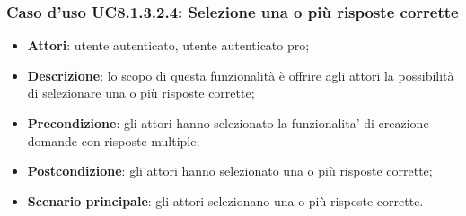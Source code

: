 \subsubsection{Caso d'uso UC8.1.3.2.4: Selezione una o più risposte corrette}
	\begin{itemize}
		\item
			\textbf{Attori}: utente autenticato, utente autenticato pro;
		\item		
			\textbf{Descrizione}: lo scopo di questa funzionalità è offrire agli attori la possibilità di selezionare una o più risposte corrette;
		\item
			\textbf{Precondizione}: gli attori hanno selezionato la funzionalita' di creazione domande con risposte multiple; 
		\item
			\textbf{Postcondizione}: gli attori hanno selezionato una o più risposte corrette;
		\item
			\textbf{Scenario principale}: gli attori selezionano una o più risposte corrette. 			
	\end{itemize}

	
	
	
	
	
	
	